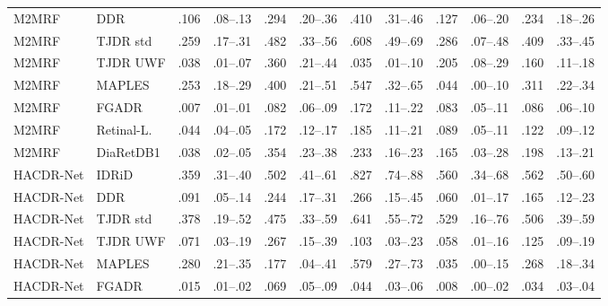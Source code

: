 \begin{landscape}
{\begin{longtable}{l l c c c c c c c c c c}
M2MRF & DDR & .106 & \scriptsize .08--.13 & .294 & \scriptsize .20--.36 & .410 & \scriptsize .31--.46 & .127 & \scriptsize .06--.20 & .234 & \scriptsize .18--.26 \\
M2MRF & TJDR std & .259 & \scriptsize .17--.31 & .482 & \scriptsize .33--.56 & .608 & \scriptsize .49--.69 & .286 & \scriptsize .07--.48 & .409 & \scriptsize .33--.45 \\
M2MRF & TJDR UWF & .038 & \scriptsize .01--.07 & .360 & \scriptsize .21--.44 & .035 & \scriptsize .01--.10 & .205 & \scriptsize .08--.29 & .160 & \scriptsize .11--.18 \\
M2MRF & MAPLES & .253 & \scriptsize .18--.29 & .400 & \scriptsize .21--.51 & .547 & \scriptsize .32--.65 & .044 & \scriptsize .00--.10 & .311 & \scriptsize .22--.34 \\
M2MRF & FGADR & .007 & \scriptsize .01--.01 & .082 & \scriptsize .06--.09 & .172 & \scriptsize .11--.22 & .083 & \scriptsize .05--.11 & .086 & \scriptsize .06--.10 \\
M2MRF & Retinal-L. & .044 & \scriptsize .04--.05 & .172 & \scriptsize .12--.17 & .185 & \scriptsize .11--.21 & .089 & \scriptsize .05--.11 & .122 & \scriptsize .09--.12 \\
M2MRF & DiaRetDB1 & .038 & \scriptsize .02--.05 & .354 & \scriptsize .23--.38 & .233 & \scriptsize .16--.23 & .165 & \scriptsize .03--.28 & .198 & \scriptsize .13--.21 \\
HACDR-Net & IDRiD & .359 & \scriptsize .31--.40 & .502 & \scriptsize .41--.61 & .827 & \scriptsize .74--.88 & .560 & \scriptsize .34--.68 & .562 & \scriptsize .50--.60 \\
HACDR-Net & DDR & .091 & \scriptsize .05--.14 & .244 & \scriptsize .17--.31 & .266 & \scriptsize .15--.45 & .060 & \scriptsize .01--.17 & .165 & \scriptsize .12--.23 \\
HACDR-Net & TJDR std & .378 & \scriptsize .19--.52 & .475 & \scriptsize .33--.59 & .641 & \scriptsize .55--.72 & .529 & \scriptsize .16--.76 & .506 & \scriptsize .39--.59 \\
HACDR-Net & TJDR UWF & .071 & \scriptsize .03--.19 & .267 & \scriptsize .15--.39 & .103 & \scriptsize .03--.23 & .058 & \scriptsize .01--.16 & .125 & \scriptsize .09--.19 \\
HACDR-Net & MAPLES & .280 & \scriptsize .21--.35 & .177 & \scriptsize .04--.41 & .579 & \scriptsize .27--.73 & .035 & \scriptsize .00--.15 & .268 & \scriptsize .18--.34 \\
HACDR-Net & FGADR & .015 & \scriptsize .01--.02 & .069 & \scriptsize .05--.09 & .044 & \scriptsize .03--.06 & .008 & \scriptsize .00--.02 & .034 & \scriptsize .03--.04 \\

\end{longtable}}
\end{landscape}
